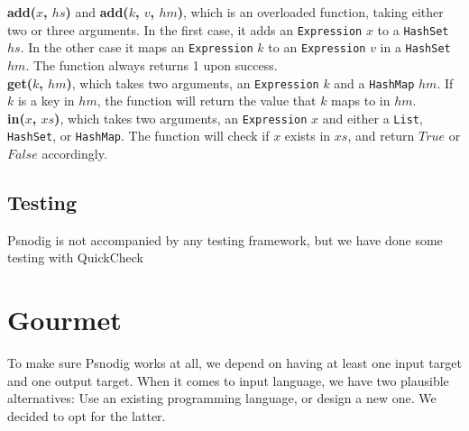 \textbf{add($x$, $hs$)} and \textbf{add($k$, $v$, $hm$)}, which is an overloaded function, taking either two or three arguments. In the first case, it adds an \texttt{Expression} $x$ to a \texttt{HashSet} $hs$. In the other case it maps an \texttt{Expression} $k$ to an \texttt{Expression} $v$ in a \texttt{HashSet} $hm$. The function always returns 1 upon success. \\

\textbf{get($k$, $hm$)}, which takes two arguments, an \texttt{Expression} $k$ and a \texttt{HashMap} $hm$. If $k$ is a key in $hm$, the function will return the value that $k$ maps to in $hm$. \\

\textbf{in($x$, $xs$)}, which takes two arguments, an \texttt{Expression} $x$ and either a \texttt{List}, \texttt{HashSet}, or \texttt{HashMap}. The function will check if $x$ exists in $xs$, and return $True$ or $False$ accordingly.

\subsection{Testing}

Psnodig is not accompanied by any testing framework, but we have done some testing with QuickCheck \hfill \\



\section{Gourmet}

To make sure Psnodig works at all, we depend on having at least one input target and one output target. When it comes to input language, we have two plausible alternatives: Use an existing programming language, or design a new one. We decided to opt for the latter. \hfill \\

